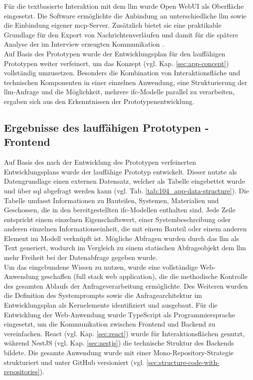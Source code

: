 Für die textbasierte Interaktion mit dem \gls{llm} wurde Open WebUI als Oberfläche eingesetzt.
Die Software ermöglichte die Anbindung an unterschiedliche \gls{llm} sowie die Einbindung eigener \gls{mcp}-Server.
Zusätzlich bietet sie eine praktikable Grundlage für den Export von Nachrichtenverläufen und damit für die spätere Analyse der im Interview erzeugten Kommunikation \cite{openwebui2026home}. \\

Auf Basis des Prototypen wurde der Entwicklungsplan für den lauffähigen Prototypen weiter verfeinert, um das Konzept (vgl. Kap. \ref{sec:app-concept}) vollständig umzusetzen.
Besonders die Kombination von Interaktionsfläche und technischen Komponenten in einer einzelnen Anwendung, eine Strukturierung der \gls{llm}-Anfrage 
und die Möglichkeit, mehrere \gls{ifc}-Modelle parallel zu verarbeiten, ergaben sich aus den Erkenntnissen der Prototypenentwicklung. \\

\subsection{Ergebnisse des lauffähigen Prototypen - Frontend}

Auf Basis des nach der Entwicklung des Prototypen verfeinerten Entwicklungsplans wurde der lauffähige Prototyp entwickelt. 
Dieser nutzte als Datengrundlage einen externen Datensatz, welcher als Tabelle eingebettet wurde und über \gls{sql} abgefragt werden kann (vgl. Tab. \ref{tab:104_app-data-structure}).
Die Tabelle umfasst Informationen zu Bauteilen, Systemen, Materialien und Geschossen, die in den bereitgestellten \gls{ifc}-Modellen enthalten sind.
Jede Zeile entspricht einem einzelnen Eigenschaftswert, einer Systembeschreibung oder anderen einzelnen Informationseinheit, die mit einem Bauteil oder einem anderen Element im Modell verknüpft ist. 
Mögliche Abfragen wurden durch das \gls{llm} als Text generiert, wodurch im Vergleich zu einem statischen Abfrageobjekt dem \gls{llm} mehr Freiheit bei der Datenabfrage gegeben wurde. \\

Um das eingebundene Wissen zu nutzen, wurde eine vollständige Web-Anwendung geschaffen (full stack web application), die die methodische Kontrolle des gesamten Ablaufs der Anfrageverarbeitung ermöglichte.
Des Weiteren wurden die Definition des Systemprompts sowie die Anfragearchitektur im Entwicklungsplan als Kernelemente identifiziert und ausgebaut.
Für die Entwicklung der Web-Anwendung wurde TypeScript als Programmiersprache eingesetzt, um die Kommunikation zwischen Frontend und Backend zu vereinfachen.
React (vgl. Kap. \ref{sec:react}) wurde für Interaktionsflächen genutzt, während NestJS (vgl. Kap. \ref{sec:nestjs}) die technische Struktur des Backends bildete.
Die gesamte Anwendung wurde mit einer Mono-Repository-Strategie strukturiert und unter GitHub versioniert (vgl. \ref{sec:structure-code-with-repositories}). \\

